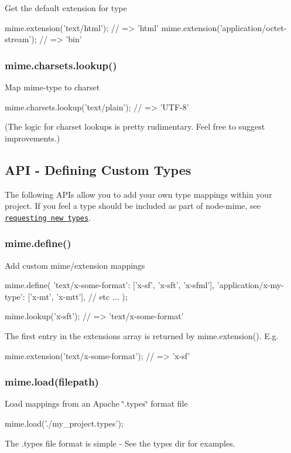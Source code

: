 Get the default extension for {\ttfamily type} \begin{DoxyVerb}mime.extension('text/html');                 // => 'html'
mime.extension('application/octet-stream');  // => 'bin'
\end{DoxyVerb}


\subsubsection*{mime.\+charsets.\+lookup()}

Map mime-\/type to charset \begin{DoxyVerb}mime.charsets.lookup('text/plain');        // => 'UTF-8'
\end{DoxyVerb}


(The logic for charset lookups is pretty rudimentary. Feel free to suggest improvements.)

\subsection*{A\+PI -\/ Defining Custom Types}

The following A\+P\+Is allow you to add your own type mappings within your project. If you feel a type should be included as part of node-\/mime, see \href{https://github.com/broofa/node-mime/wiki/Requesting-New-Types}{\tt requesting new types}.

\subsubsection*{mime.\+define()}

Add custom mime/extension mappings \begin{DoxyVerb}mime.define({
    'text/x-some-format': ['x-sf', 'x-sft', 'x-sfml'],
    'application/x-my-type': ['x-mt', 'x-mtt'],
    // etc ...
});

mime.lookup('x-sft');                 // => 'text/x-some-format'
\end{DoxyVerb}


The first entry in the extensions array is returned by {\ttfamily mime.\+extension()}. E.\+g. \begin{DoxyVerb}mime.extension('text/x-some-format'); // => 'x-sf'
\end{DoxyVerb}


\subsubsection*{mime.\+load(filepath)}

Load mappings from an Apache \char`\"{}.\+types\char`\"{} format file \begin{DoxyVerb}mime.load('./my_project.types');
\end{DoxyVerb}


The .types file format is simple -\/ See the {\ttfamily types} dir for examples. 